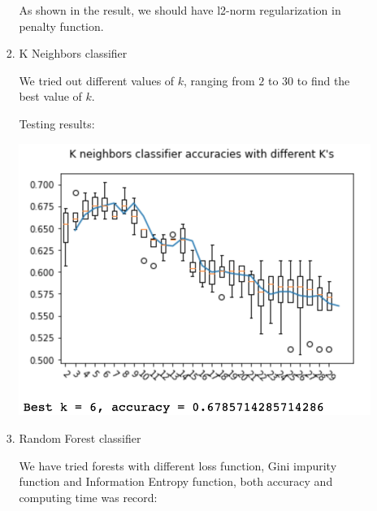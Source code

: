 \documentclass[11.5pt]{article}
\begin{document}
\begin{enumerate}
\begin{itemize}
\begin{enumerate}
                As shown in the result, we should have l2-norm regularization in penalty function.

                \item K Neighbors classifier

                We tried out different values of $k$, ranging from $2$ to $30$ to find the best value of $k$.

                Testing results:

                \includegraphics[width=0.75\linewidth]{images/knn_k.png}

                \item Random Forest classifier

                We have tried forests with different loss function, Gini impurity function and Information Entropy function, both accuracy and computing time was record:


\end{enumerate}
\end{itemize}
\end{enumerate}
\end{document}
